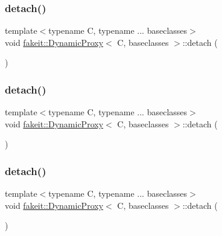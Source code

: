 \subsubsection{\texorpdfstring{detach()}{detach()}\hspace{0.1cm}{\footnotesize\ttfamily [7/9]}}
{\footnotesize\ttfamily template$<$typename C, typename ... baseclasses$>$ \\
void \mbox{\hyperlink{structfakeit_1_1DynamicProxy}{fakeit\+::\+Dynamic\+Proxy}}$<$ C, baseclasses $>$\+::detach (\begin{DoxyParamCaption}{ }\end{DoxyParamCaption})\hspace{0.3cm}{\ttfamily [inline]}}

\mbox{\label{structfakeit_1_1DynamicProxy_a154f25eeeb36c0635d9209dd5870943e}} 
\subsubsection{\texorpdfstring{detach()}{detach()}\hspace{0.1cm}{\footnotesize\ttfamily [8/9]}}
{\footnotesize\ttfamily template$<$typename C, typename ... baseclasses$>$ \\
void \mbox{\hyperlink{structfakeit_1_1DynamicProxy}{fakeit\+::\+Dynamic\+Proxy}}$<$ C, baseclasses $>$\+::detach (\begin{DoxyParamCaption}{ }\end{DoxyParamCaption})\hspace{0.3cm}{\ttfamily [inline]}}

\mbox{\label{structfakeit_1_1DynamicProxy_a154f25eeeb36c0635d9209dd5870943e}} 
\subsubsection{\texorpdfstring{detach()}{detach()}\hspace{0.1cm}{\footnotesize\ttfamily [9/9]}}
{\footnotesize\ttfamily template$<$typename C, typename ... baseclasses$>$ \\
void \mbox{\hyperlink{structfakeit_1_1DynamicProxy}{fakeit\+::\+Dynamic\+Proxy}}$<$ C, baseclasses $>$\+::detach (\begin{DoxyParamCaption}{ }\end{DoxyParamCaption})\hspace{0.3cm}{\ttfamily [inline]}}

